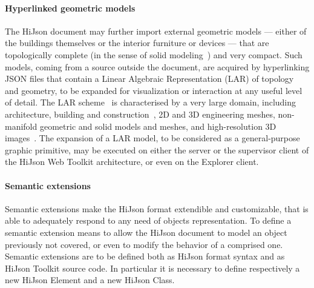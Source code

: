 \documentclass{sig-alternate}
\begin{document}
\paragraph{Hyperlinked geometric models}

The HiJson document may further import external geometric models --- either of the buildings themselves or the interior furniture or devices --- that are topologically complete (in the sense of solid modeling~\cite{Dicarlo:2014:TNL:2543138.2543294}) and very compact. Such models, coming from a source outside the document, are acquired by hyperlinking JSON files that contain a Linear Algebraic Representation (LAR) of topology and geometry, to be expanded for visualization or interaction at any useful level of detail.
The LAR scheme~\cite{Dicarlo:2014:TNL:2543138.2543294} is characterised by a very large domain, including architecture, building and construction~\cite{paoluzziMS:2014}, 2D and 3D engineering meshes, non-manifold geometric and solid models and meshes, and high-resolution 3D images~\cite{cadanda:2015}. 
The expansion of a LAR model, to be considered as a general-purpose graphic primitive, may be executed on either the server or the supervisor client of the HiJson Web Toolkit architecture, or even on the Explorer client.

\paragraph{Semantic extensions}
Semantic extensions make the HiJson format extendible and customizable, that is able to adequately respond to any need of objects representation. To define a semantic extension means to allow the HiJson document to model an object previously not covered, or even to modify the behavior of a comprised one. Semantic extensions are to be defined both as HiJson format syntax and as HiJson Toolkit source code. In particular it is necessary to define respectively a new HiJson Element and a new HiJson Class.
\end{document}
